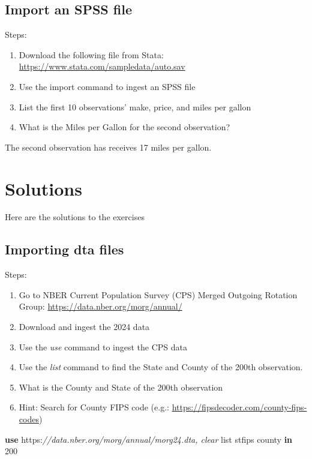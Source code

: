 \documentclass[
]{book}
\newenvironment{Shaded}{\begin{snugshade}}{\end{snugshade}}
\newcommand{\CommentTok}[1]{\textcolor[rgb]{0.56,0.35,0.01}{\textit{#1}}}
\newcommand{\KeywordTok}[1]{\textcolor[rgb]{0.13,0.29,0.53}{\textbf{#1}}}
\newcommand{\NormalTok}[1]{#1}
\newcommand{\OtherTok}[1]{\textcolor[rgb]{0.56,0.35,0.01}{#1}}
\providecommand{\tightlist}{%
  \setlength{\itemsep}{0pt}\setlength{\parskip}{0pt}}
\begin{document}
\section{Import an SPSS file}\label{import-an-spss-file}

Steps:

\begin{enumerate}
\def\labelenumi{\arabic{enumi}.}
\tightlist
\item
  Download the following file from Stata: \url{https://www.stata.com/sampledata/auto.sav}
\item
  Use the import command to ingest an SPSS file
\item
  List the first 10 observations' make, price, and miles per gallon
\item
  What is the Miles per Gallon for the second observation?
\end{enumerate}

The second observation has receives 17 miles per gallon.

\chapter{Solutions}\label{solutions}

Here are the solutions to the exercises

\section{Importing dta files}\label{importing-dta-files-1}

Steps:

\begin{enumerate}
\def\labelenumi{\arabic{enumi}.}
\tightlist
\item
  Go to NBER Current Population Survey (CPS) Merged Outgoing Rotation Group: \url{https://data.nber.org/morg/annual/}
\item
  Download and ingest the 2024 data
\item
  Use the \emph{use} command to ingest the CPS data
\item
  Use the \emph{list} command to find the State and County of the 200th observation.
\item
  What is the County and State of the 200th observation
\item
  Hint: Search for County FIPS code (e.g.: \url{https://fipsdecoder.com/county-fips-codes})
\end{enumerate}

\begin{Shaded}
\begin{Highlighting}[]
\KeywordTok{use}\NormalTok{ https:}\CommentTok{//data.nber.org/morg/annual/morg24.dta, clear}
\OtherTok{list}\NormalTok{ stfips county }\KeywordTok{in}\NormalTok{ 200}
\end{Highlighting}
\end{Shaded}
\end{document}
